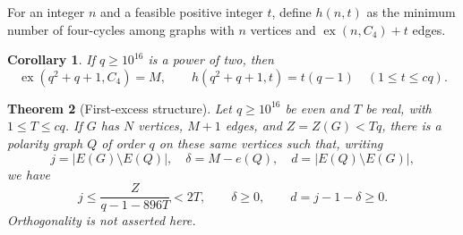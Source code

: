 \documentclass[11pt]{article}
\newtheorem{theorem}{Theorem}
\newtheorem{corollary}[theorem]{Corollary}
\theoremstyle{remark}\newtheorem*{remark}{Remark}
\begin{document}
For an integer $n$ and a feasible positive integer $t$, define $h(n,t)$ as the minimum number of four-cycles among graphs with $n$ vertices and $\operatorname{ex}(n,C_4)+t$ edges.
\begin{corollary}\label{cor:power}
If $q\geq10^{16}$ is a power of two, then
\[
 \operatorname{ex}(q^2+q+1,C_4)=M,\qquad
 h(q^2+q+1,t)=t(q-1)\quad(1\leq t\leq cq).
\]
\end{corollary}
\begin{theorem}[First-excess structure]\label{thm:first}
Let $q\geq10^{16}$ be even and $T$ be real, with $1\leq T\leq cq$. If $G$ has $N$ vertices, $M+1$ edges, and $Z=Z(G)<Tq$, there is a polarity graph $Q$ of order $q$ on these same vertices such that, writing
\[
 j=|E(G)\setminus E(Q)|,\quad \delta=M-e(Q),\quad
 d=|E(Q)\setminus E(G)|,
\]
we have
\[
 j\leq\frac{Z}{q-1-896T}<2T,\qquad
 \delta\geq0,\qquad d=j-1-\delta\geq0.
\]
Orthogonality is not asserted here.
\end{theorem}
\end{document}
